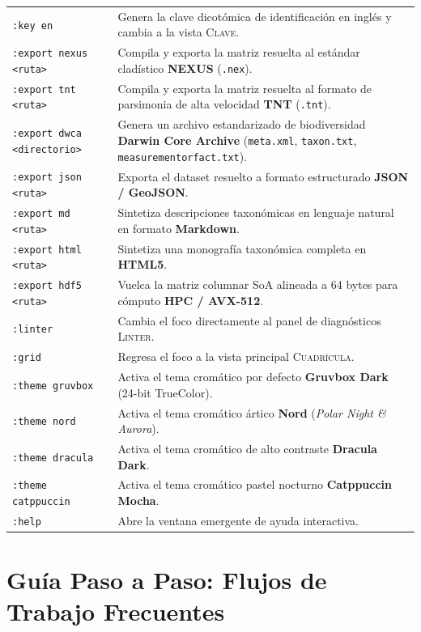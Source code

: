\documentclass[11pt,a4paper]{article}
\newcommand{\excmd}[1]{\texttt{:#1}}
\begin{document}
\begin{table}[ht]
\begin{tabularx}{\textwidth}{@{}l X@{}}
\excmd{key en} & Genera la clave dicotómica de identificación en inglés y cambia a la vista \textsc{Clave}. \\
\excmd{export nexus <ruta>} & Compila y exporta la matriz resuelta al estándar cladístico \textbf{NEXUS} (\texttt{.nex}). \\
\excmd{export tnt <ruta>} & Compila y exporta la matriz resuelta al formato de parsimonia de alta velocidad \textbf{TNT} (\texttt{.tnt}). \\
\excmd{export dwca <directorio>} & Genera un archivo estandarizado de biodiversidad \textbf{Darwin Core Archive} (\texttt{meta.xml}, \texttt{taxon.txt}, \texttt{measurementorfact.txt}). \\
\excmd{export json <ruta>} & Exporta el dataset resuelto a formato estructurado \textbf{JSON / GeoJSON}. \\
\excmd{export md <ruta>} & Sintetiza descripciones taxonómicas en lenguaje natural en formato \textbf{Markdown}. \\
\excmd{export html <ruta>} & Sintetiza una monografía taxonómica completa en \textbf{HTML5}. \\
\excmd{export hdf5 <ruta>} & Vuelca la matriz columnar SoA alineada a 64 bytes para cómputo \textbf{HPC / AVX-512}. \\
\excmd{linter} & Cambia el foco directamente al panel de diagnósticos \textsc{Linter}. \\
\excmd{grid} & Regresa el foco a la vista principal \textsc{Cuadrícula}. \\
\excmd{theme gruvbox} & Activa el tema cromático por defecto \textbf{Gruvbox Dark} (24-bit TrueColor). \\
\excmd{theme nord} & Activa el tema cromático ártico \textbf{Nord} (\textit{Polar Night \& Aurora}). \\
\excmd{theme dracula} & Activa el tema cromático de alto contraste \textbf{Dracula Dark}. \\
\excmd{theme catppuccin} & Activa el tema cromático pastel nocturno \textbf{Catppuccin Mocha}. \\
\excmd{help} & Abre la ventana emergente de ayuda interactiva. \\
\bottomrule
\end{tabularx}
\end{table}

\section{Guía Paso a Paso: Flujos de Trabajo Frecuentes}
\label{sec:flujos}
\end{document}
